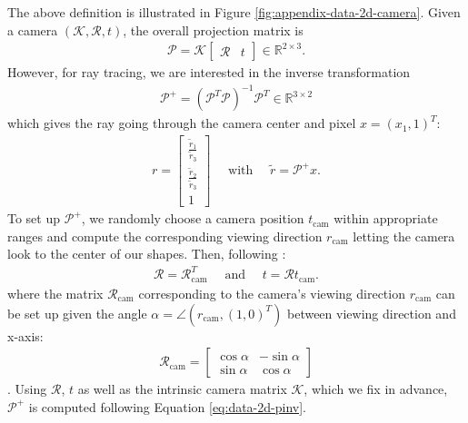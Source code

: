 The above definition is illustrated in Figure \ref{fig:appendix-data-2d-camera}.
Given a camera $(\mathcal{K}, \mathcal{R}, t)$, the overall projection matrix is
\begin{align}
  \mathcal{P} = \mathcal{K}\left[\begin{matrix} \mathcal{R} & t\end{matrix}\right] \in \mathbb{R}^{2 \times 3}.
\end{align}
However, for ray tracing, we are interested in the inverse transformation \cite[Chapter~6]{HartleyZisserman:2006}
\begin{align}
  \mathcal{P}^+ = (\mathcal{P}^T \mathcal{P})^{-1} \mathcal{P}^T \in \mathbb{R}^{3 \times 2}
  \label{eq:data-2d-pinv}
\end{align}
which gives the ray going through the camera center
and pixel $x = (x_1, 1)^T$:
\begin{align}
  r = \left[\begin{matrix}
    \frac{\tilde{r}_1}{\tilde{r}_3}\\
    \frac{\tilde{r}_2}{\tilde{r}_3}\\
    1
  \end{matrix}\right]
  \quad\text{ with }\quad \tilde{r} = \mathcal{P}^+ x.
\end{align}
To set up $\mathcal{P}^+$, we randomly choose a camera position $t_{\text{cam}}$
within appropriate ranges and compute the corresponding viewing direction $r_{\text{cam}}$
letting the camera look to the center of our shapes. Then,
following \cite[Chapter~6]{HartleyZisserman:2006}:
\begin{align}
  \mathcal{R} = \mathcal{R}_{\text{cam}}^T\quad\text{ and }\quad t = \mathcal{R}t_{\text{cam}}.
\end{align}
where the matrix $\mathcal{R}_{\text{cam}}$ corresponding to the camera's viewing
direction $r_{\text{cam}}$ can be set up given the angle
$\alpha = \angle(r_{\text{cam}}, (1,0)^T)$ between viewing direction and
x-axis:
\begin{align}
  \mathcal{R}_{\text{cam}} = \left[\begin{matrix}
    \cos \alpha & -\sin \alpha\\
    \sin \alpha & \cos \alpha
  \end{matrix}\right]
\end{align}.
Using $\mathcal{R}$, $t$ as well as the intrinsic camera matrix $\mathcal{K}$,
which we fix in advance, $\mathcal{P}^+$ is computed following Equation \eqref{eq:data-2d-pinv}.

